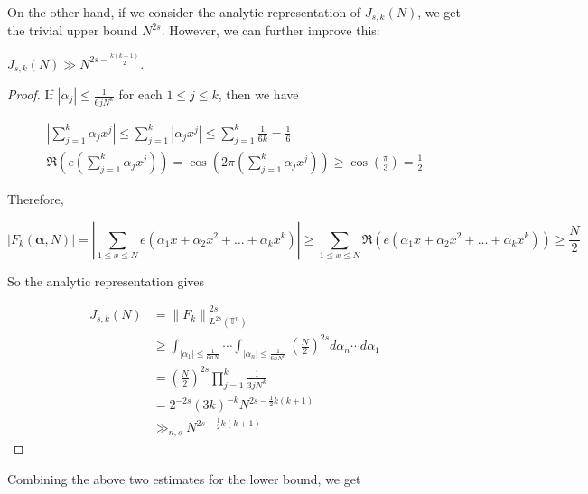 On the other hand, if we consider the analytic representation of $J_{s, k}(N)$, we get the trivial upper bound $N^{2 s}$. However, we can further improve this:

\begin{thm}
    $J_{s, k}(N) \gg N^{2 s-\frac{k(k+1)}{2}}$.
\end{thm}
\begin{proof}
 If $\left|\alpha_{j}\right| \leq \frac{1}{6 j N^{k}}$ for each $1 \leq j \leq k$, then we have

$$
\begin{gathered}
\left|\sum_{j=1}^{k} \alpha_{j} x^{j}\right| \leq \sum_{j=1}^{k}\left|\alpha_{j} x^{j}\right| \leq \sum_{j=1}^{k} \frac{1}{6 k}=\frac{1}{6} \\
\Re\left(e\left(\sum_{j=1}^{k} \alpha_{j} x^{j}\right)\right)=\cos \left(2 \pi\left(\sum_{j=1}^{k} \alpha_{j} x^{j}\right)\right) \geq \cos \left(\frac{\pi}{3}\right)=\frac{1}{2}
\end{gathered}
$$

Therefore,

$$
\left|F_{k}(\boldsymbol{\alpha}, N)\right|=\left|\sum_{1 \leqslant x \leqslant N}  e\left(\alpha_{1} x+\alpha_{2} x^{2}+\ldots+\alpha_{k} x^{k}\right)\right| \geq \sum_{1 \leqslant x \leqslant N}  \Re\left(e\left(\alpha_{1} x+\alpha_{2} x^{2}+\ldots+\alpha_{k} x^{k}\right)\right) \geq \frac{N}{2}
$$

So the analytic representation gives

$$
\begin{aligned}
J_{s, k}(N) & =\|\left. F_{k}\|\right._{L^{2 s}\left(\mathbb{T}^{n}\right)} ^{2 s} \\
& \geq \int_{\left|\alpha_{1}\right| \leq \frac{1}{6 n N}} \cdots \int_{\left|\alpha_{n}\right| \leq \frac{1}{6 n N^{n}}}\left(\frac{N}{2}\right)^{2 s} d \alpha_{n} \cdots d \alpha_{1} \\
& =\left(\frac{N}{2}\right)^{2 s} \prod_{j=1}^{k} \frac{1}{3 j N^{k}} \\
& =2^{-2 s}(3 k)^{-k} N^{2 s-\frac{1}{2} k(k+1)} \\
& \gg_{n, s} N^{2 s-\frac{1}{2} k(k+1)}
\end{aligned}
$$
\end{proof}

Combining the above two estimates for the lower bound, we get

